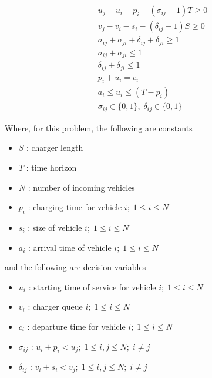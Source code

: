 \documentclass[letterpaper, 10pt, conference]{IEEEtran}
\begin{document}
\begin{subequations}
\label{eq:bapconstrs}
\begin{align}
    u_j - u_i - p_i - (\sigma_{ij} - 1)T \geq 0                     \label{subeq:baptime}         \\
    v_j - v_i - s_i - (\delta_{ij} - 1)S \geq 0                     \label{subeq:bapspace}        \\
    \sigma_{ij} + \sigma_{ji} + \delta_{ij} + \delta_{ji} \geq 1    \label{subeq:bapvalid_pos}    \\
    \sigma_{ij} + \sigma_{ji} \leq 1                                \label{subeq:bapsigma}        \\
    \delta_{ij} + \delta_{ji} \leq 1                                \label{subeq:bapdelta}        \\
    p_i + u_i = c_i                                                 \label{subeq:bapdetach}       \\
    a_i \leq u_i \leq (T - p_i)                                     \label{subeq:bapvalid_starts} \\
    \sigma_{ij} \in \{0,1\},\;\delta_{ij} \in \{0,1\}               \label{subeq:bapsdspace}
\end{align}
\end{subequations}

\noindent
Where, for this problem, the following are constants

\begin{itemize}
	\item $S$   : charger length
	\item $T$   : time horizon
	\item $N$   : number of incoming vehicles
	\item $p_i$ : charging time for vehicle $i;\; 1 \leq i \leq N$
	\item $s_i$ : size of vehicle $i;\; 1 \leq i \leq N$
	\item $a_i$ : arrival time of vehicle $i;\; 1 \leq i \leq N$
\end{itemize}

\noindent
and the following are decision variables

\begin{itemize}
    \item $u_i$         : starting time of service for vehicle $i;\; 1 \leq i \leq N$
    \item $v_i$         : charger queue $i;\; 1 \leq i \leq N$
    \item $c_i$         : departure time for vehicle $i;\; 1 \leq i \leq N$
    \item $\sigma_{ij}$ : $u_i + p_i < u_j;\; 1 \leq i,j \leq N ;\; i \neq j $
    \item $\delta_{ij}$ : $v_i + s_i < v_j;\; 1 \leq i,j \leq N ;\; i \neq j $
\end{itemize}
\end{document}
